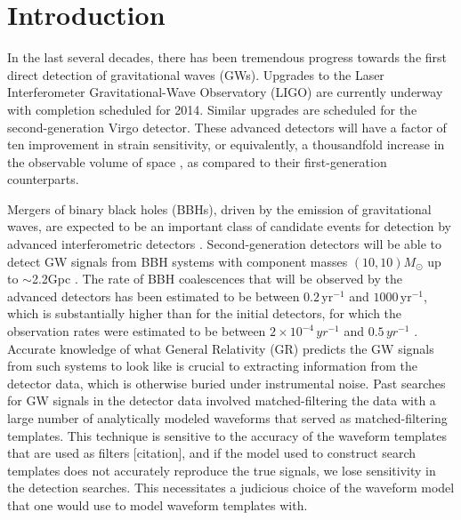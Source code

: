 \documentclass[aps,
prd,
amsmath,
amssymb,
twocolumn,
floatfix,
groupedaddress]{revtex4-1}
\begin{document}
\section{Introduction}\label{sec:level1:Introduction}
In the last several decades, there has been tremendous progress towards the first direct detection of gravitational waves (GWs). Upgrades to the Laser Interferometer Gravitational-Wave Observatory (LIGO) are currently underway with completion scheduled for 2014. Similar upgrades are scheduled for the second-generation Virgo detector. These advanced detectors will have a factor of ten improvement in strain sensitivity, or equivalently, a thousandfold increase in the observable volume of space \citep{aLIGOsensitivity}, as compared to their first-generation counterparts.

Mergers of binary black holes (BBHs), driven by the emission of gravitational waves, are expected to be an important class of candidate events for detection by advanced interferometric detectors \citep{300yrsofGravitation}. Second-generation detectors will be able to detect GW signals from BBH systems with component masses $(10,10)M_{\odot}$ up to $\sim$2.2Gpc \citep{DamourF2EOB01}. The rate of BBH coalescences that will be observed by the advanced detectors has been estimated to be between $0.2\,\mathrm{yr}^{-1}$ and $1000\,\mathrm{yr}^{-1}$, which is substantially higher than for the initial detectors, for which the observation rates were estimated to be between $2\times10^{-4}\,yr^{-1}$ and $0.5\,yr^{-1}$ \citep{LSCCBCRates2010}. Accurate knowledge of what General Relativity (GR) predicts the GW signals from such systems to look like is crucial to extracting information from the detector data, which is otherwise buried under instrumental noise. Past searches for GW signals in the detector data \citep{LSCSearch2004,LSCSearch2005,LSCSearch2008} involved matched-filtering \citep{JolienGWPhysAst} the data with a large number of analytically modeled waveforms that served as matched-filtering templates. This technique is sensitive to the accuracy of the waveform templates that are used as filters [citation], and if the model used to construct search templates does not accurately reproduce the true signals, we lose sensitivity in the detection searches. This necessitates a judicious choice of the waveform model that one would use to model waveform templates with.
\end{document}
